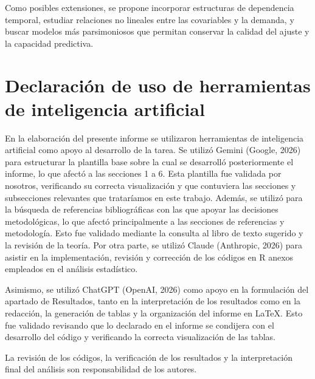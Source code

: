 \documentclass[12pt, a4paper]{article}
\numberwithin{equation}{section}
\begin{document}
Como posibles extensiones, se propone incorporar estructuras
de dependencia temporal, estudiar relaciones no lineales
entre las covariables y la demanda, y buscar modelos más
parsimoniosos que permitan conservar la calidad del ajuste
y la capacidad predictiva.
\newpage
\FloatBarrier
\section{Declaración de uso de herramientas de inteligencia artificial}\label{sec:ia}
En la elaboración del presente informe se utilizaron
herramientas de inteligencia artificial como apoyo al
desarrollo de la tarea. Se utilizó Gemini (Google, 2026) \cite{google}
para estructurar la plantilla base sobre la cual se desarrolló posteriormente el informe, lo que afectó a las secciones 1 a 6. Esta plantilla fue validada por nosotros, verificando su correcta visualización y que contuviera las secciones y subsecciones relevantes que trataríamos en este trabajo. Además, se utilizó para la búsqueda de referencias bibliográficas con las que apoyar las decisiones metodológicas, lo que afectó principalmente a las secciones de referencias y metodología. Esto fue validado mediante la consulta al libro de texto sugerido y la revisión de la teoría. Por otra parte, se utilizó Claude
(Anthropic, 2026) \cite{anthropic} para asistir en la implementación, revisión y corrección de los códigos en R anexos empleados en el análisis estadístico.

Asimismo, se utilizó ChatGPT (OpenAI, 2026) \cite{openai} como apoyo
en la formulación del apartado de Resultados, tanto en la interpretación de los resultados como en la
redacción, la generación de tablas y la organización del informe en \LaTeX. Esto fue validado revisando que lo declarado en el informe se condijera con el desarrollo del código y verificando la correcta visualización de las tablas.

La revisión de los códigos, la verificación de los
resultados y la interpretación final del análisis
son responsabilidad de los autores.
\end{document}
